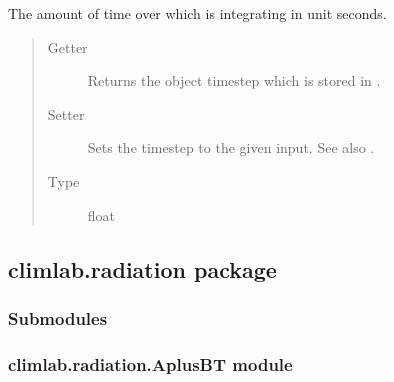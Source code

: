 \documentclass[letterpaper,10pt,english]{sphinxmanual}
\begin{document}
\begin{fulllineitems}
\begin{fulllineitems}
\end{fulllineitems}


\begin{fulllineitems}
\label{api/climlab.process:climlab.process.time_dependent_process.TimeDependentProcess.timestep}
The amount of time over which {\hyperref[api/climlab.process:climlab.process.time_dependent_process.TimeDependentProcess.step_forward]{\emph{}}} is integrating in unit seconds.
\begin{quote}\begin{description}
\item[{Getter}] \leavevmode
Returns the object timestep which is stored in .

\item[{Setter}] \leavevmode
Sets the timestep to the given input. See also {\hyperref[api/climlab.process:climlab.process.time_dependent_process.TimeDependentProcess.set_timestep]{\emph{}}}.

\item[{Type}] \leavevmode
float

\end{description}\end{quote}

\end{fulllineitems}


\end{fulllineitems}



\subsection{climlab.radiation package}
\label{api/climlab.radiation:climlab-radiation-package}\label{api/climlab.radiation::doc}

\subsubsection{Submodules}
\label{api/climlab.radiation:submodules}

\subsubsection{climlab.radiation.AplusBT module}
\label{api/climlab.radiation:climlab-radiation-aplusbt-module}\label{api/climlab.radiation:module-climlab.radiation.AplusBT}
\end{document}

